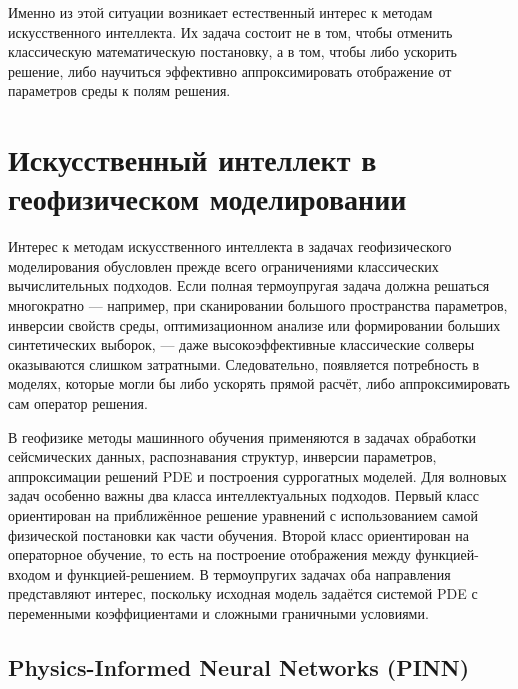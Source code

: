 Именно из этой ситуации возникает естественный интерес к методам искусственного интеллекта. Их задача состоит не в том, чтобы отменить классическую математическую постановку, а в том, чтобы либо ускорить решение, либо научиться эффективно аппроксимировать отображение от параметров среды к полям решения.

\section{Искусственный интеллект в геофизическом моделировании}

Интерес к методам искусственного интеллекта в задачах геофизического моделирования обусловлен прежде всего ограничениями классических вычислительных подходов. Если полная термоупругая задача должна решаться многократно --- например, при сканировании большого пространства параметров, инверсии свойств среды, оптимизационном анализе или формировании больших синтетических выборок, --- даже высокоэффективные классические солверы оказываются слишком затратными. Следовательно, появляется потребность в моделях, которые могли бы либо ускорять прямой расчёт, либо аппроксимировать сам оператор решения.

В геофизике методы машинного обучения применяются в задачах обработки сейсмических данных, распознавания структур, инверсии параметров, аппроксимации решений PDE и построения суррогатных моделей. Для волновых задач особенно важны два класса интеллектуальных подходов. Первый класс ориентирован на приближённое решение уравнений с использованием самой физической постановки как части обучения. Второй класс ориентирован на операторное обучение, то есть на построение отображения между функцией-входом и функцией-решением. В термоупругих задачах оба направления представляют интерес, поскольку исходная модель задаётся системой PDE с переменными коэффициентами и сложными граничными условиями.

\subsection*{Physics-Informed Neural Networks (PINN)}

